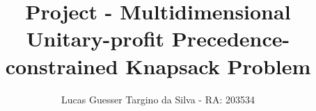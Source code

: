 \documentclass{article}
\title{Project -  Multidimensional Unitary-profit Precedence-constrained Knapsack Problem}
\author{Lucas Guesser Targino da Silva - RA: 203534}
\theoremstyle{definition}
\begin{document}
\maketitle
























\begin{appendices}

    

\end{appendices}
\end{document}
